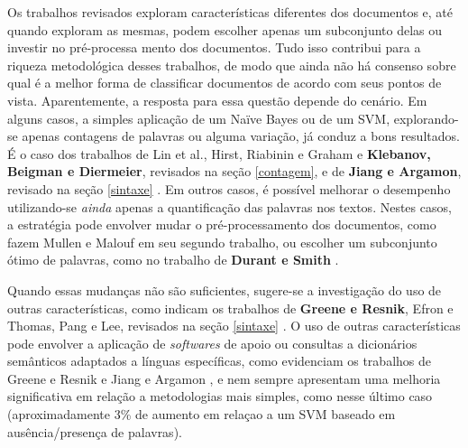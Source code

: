 Os trabalhos revisados exploram características diferentes dos documentos e, até quando exploram as mesmas, podem escolher apenas um subconjunto delas ou investir no pré-processa mento dos documentos. Tudo isso contribui para a riqueza metodológica desses trabalhos, de modo que ainda não há consenso sobre qual é a melhor forma de classificar documentos de acordo com seus pontos de vista. Aparentemente, a resposta para essa questão depende do cenário. Em alguns casos, a simples aplicação de um Naïve Bayes ou de um SVM, explorando-se apenas contagens de palavras ou alguma variação, já conduz a bons resultados. É o caso dos trabalhos de Lin et al., Hirst, Riabinin e Graham e \textbf{Klebanov, Beigman e Diermeier}, revisados na seção \ref{contagem}, e de \textbf{Jiang e Argamon}, revisado na seção \ref{sintaxe} \cite{lin-et-al2006} \cite{hirst-et-al} \cite{klebanov} \cite{jiang-argamon}. Em outros casos, é possível melhorar o desempenho utilizando-se \emph{ainda} apenas a quantificação das palavras nos textos. Nestes casos, a estratégia pode envolver mudar o pré-processamento dos documentos, como fazem Mullen e Malouf em seu segundo trabalho, ou escolher um subconjunto ótimo de palavras, como no trabalho de \textbf{Durant e Smith} \cite{malouf-taking_sides} \cite{durant-smith}.

Quando essas mudanças não são suficientes, sugere-se a investigação do uso de outras características, como indicam os trabalhos de \textbf{Greene e Resnik}, Efron e Thomas, Pang e Lee, revisados na seção \ref{sintaxe} \cite{greene} \cite{efron} \cite{get-out-the-vote}. O uso de outras características pode envolver a aplicação de \emph{softwares} de apoio ou consultas a dicionários semânticos adaptados a línguas específicas, como evidenciam os trabalhos de Greene e Resnik \cite{greene} e Jiang e Argamon \cite{jiang-argamon}, e nem sempre apresentam uma melhoria significativa em relação a metodologias mais simples, como nesse último caso (aproximadamente 3\% de aumento em relaçao a um SVM baseado em ausência/presença de palavras). %
 


